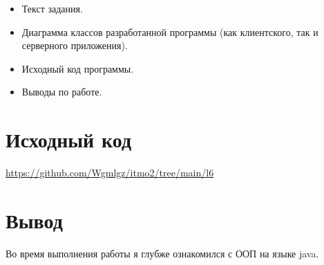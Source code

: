 \documentclass{article}
\begin{document}
\begin{itemize}
  \item Текст задания.
  \item Диаграмма классов разработанной программы (как клиентского, так и серверного приложения).
  \item Исходный код программы.
  \item Выводы по работе.
\end{itemize}




\section*{Исходный код}
\url{https://github.com/Wgmlgz/itmo2/tree/main/l6}

\section*{Вывод}
Во время выполнения работы я глубже ознакомился с ООП на языке java.
\end{document}
